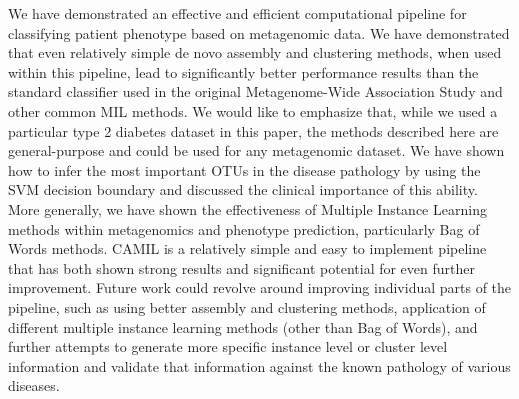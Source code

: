 
We have demonstrated an effective and efficient computational pipeline for classifying patient phenotype based on metagenomic data. We have demonstrated that even relatively simple de novo assembly and clustering methods, when used within this pipeline, lead to significantly better performance results than the standard classifier used in the original Metagenome-Wide Association Study and other common MIL methods. We would like to emphasize that, while we used a particular type 2 diabetes dataset in this paper, the methods described here are general-purpose and could be used for any metagenomic dataset. We have shown how to infer the most important OTUs in the disease pathology by using the SVM decision boundary and discussed the clinical importance of this ability. More generally, we have shown the effectiveness of Multiple Instance Learning methods within metagenomics and phenotype prediction, particularly Bag of Words methods. CAMIL is a relatively simple and easy to implement pipeline that has both shown strong results and significant potential for even further improvement. Future work could revolve around improving individual parts of the pipeline, such as using better assembly and clustering methods, application of different multiple instance learning methods (other than Bag of Words), and further attempts to generate more specific instance level or cluster level information and validate that information against the known pathology of various diseases.